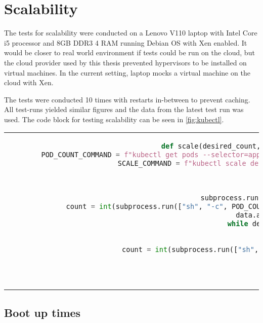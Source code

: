 \section{Scalability}
The tests for scalability were conducted on a Lenovo V110 laptop with Intel Core i5 processor and 8GB DDR3 4 RAM running Debian OS with Xen enabled. It would be closer to real world environment if tests could be run on the cloud, but the cloud provider used by this thesis prevented hypervisors to be installed on virtual machines. In the current setting, laptop mocks a virtual machine on the cloud with Xen.

The tests were conducted 10 times with restarts in-between to prevent caching. All test-runs yielded similar figures and the data from the latest test run was used. The code block for testing scalability can be seen in \ref{fig:kubectl}.

\begin{code}[htpb]
  \centering
  \begin{tabular}{c}
  \begin{lstlisting}[language=Python]
    def scale(desired_count, deployment_name): # usage: result = scale("nginx",20)
        POD_COUNT_COMMAND = f"kubectl get pods --selector=app={deployment_name} | grep 'Running\|Terminating' | wc -l" # get running or terminating pods
        SCALE_COMMAND = f"kubectl scale deployment {deployment_name} --replicas {desired_count}" # scale deployment
        data = []
        second = 0
        INTERVAL = 0.5
        subprocess.run(["sh", "-c", SCALE_COMMAND]) # execute scale command
        count = int(subprocess.run(["sh", "-c", POD_COUNT_COMMAND], stdout = subprocess.PIPE).stdout.decode("utf-8")) # count number of pods
        data.append([second, count]) # save number of pods
        while desired_count != count: # continue while scaling
            time.sleep(INTERVAL)
            second += INTERVAL
            count = int(subprocess.run(["sh", "-c", POD_COUNT_COMMAND], stdout = subprocess.PIPE).stdout.decode("utf-8"))
            data.append([second, count])

        return data

\end{lstlisting}
\end{tabular}
\caption{Testing Scalability}\label{fig:kubectl}
\end{code}
\subsection{Boot up times}


